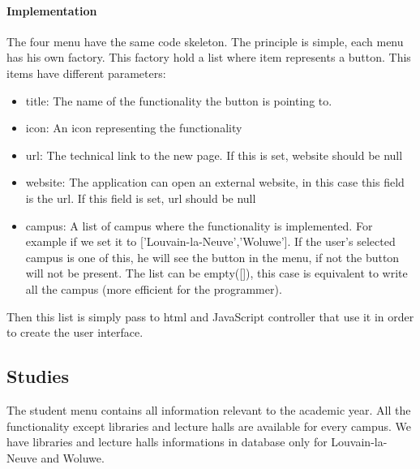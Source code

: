 \documentclass[11pt, a4paper]{report}
\begin{document}
\paragraph{Implementation}
The four menu have the same code skeleton. The principle is simple, each menu has his own factory. This factory hold a list where item represents a button. This items have different parameters: 
\begin{itemize}
\item title: The name of the functionality the button is pointing to.
\item icon: An icon representing the functionality
\item url: The technical link to the new page. If this is set, website should be null
\item website: The application can open an external website, in this case this field is the url. If this field is set, url should be null
\item campus: A list of campus where the functionality is implemented. For example if we set it to ['Louvain-la-Neuve','Woluwe']. If the user's selected campus is one of this, he will see the button in the menu, if not the button will not be present. The list can be empty([]), this case is equivalent to write all the campus (more efficient for the programmer). 
\end{itemize}
Then this list is simply pass to html and JavaScript controller that use it in order to create the user interface. 
\subsection{Studies}
The student menu contains all information relevant to the academic year. All the functionality except libraries and lecture halls are available for every campus. We have libraries and lecture halls informations in database only for Louvain-la-Neuve and Woluwe. 
\end{document}
